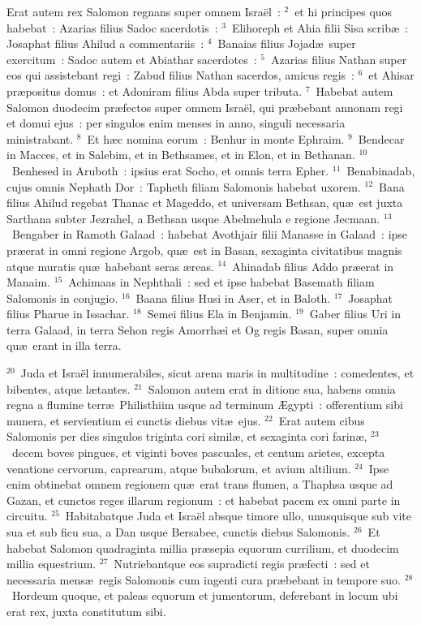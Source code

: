\bchapter
\lettrine[lines=3,image=true,loversize=0.05,lraise=-0.03]{E}{}rat autem rex Salomon regnans super omnem Isra\"el~:
${}^{2}$~et hi principes quos habebat~: Azarias filius Sadoc sacerdotis~:
${}^{3}$~Elihoreph et Ahia filii Sisa scrib\ae~: Josaphat filius Ahilud a commentariis~:
${}^{4}$~Banaias filius Jojad\ae\ super exercitum~: Sadoc autem et Abiathar sacerdotes~:
${}^{5}$~Azarias filius Nathan super eos qui assistebant regi~: Zabud filius Nathan sacerdos, amicus regis~:
${}^{6}$~et Ahisar pr\ae positus domus~: et Adoniram filius Abda super tributa.
${}^{7}$~Habebat autem Salomon duodecim pr\ae fectos super omnem Isra\"el, qui pr\ae bebant annonam regi et domui ejus~: per singulos enim menses in anno, singuli necessaria ministrabant.
${}^{8}$~Et h\ae c nomina eorum~: Benhur in monte Ephraim.
${}^{9}$~Bendecar in Macces, et in Salebim, et in Bethsames, et in Elon, et in Bethanan.
${}^{10}$~Benhesed in Aruboth~: ipsius erat Socho, et omnis terra Epher.
${}^{11}$~Benabinadab, cujus omnis Nephath Dor~: Tapheth filiam Salomonis habebat uxorem.
${}^{12}$~Bana filius Ahilud regebat Thanac et Mageddo, et universam Bethsan, qu\ae\ est juxta Sarthana subter Jezrahel, a Bethsan usque Abelmehula e regione Jecmaan.
${}^{13}$~Bengaber in Ramoth Galaad~: habebat Avothjair filii Manasse in Galaad~: ipse pr\ae erat in omni regione Argob, qu\ae\ est in Basan, sexaginta civitatibus magnis atque muratis qu\ae\ habebant seras \ae reas.
${}^{14}$~Ahinadab filius Addo pr\ae erat in Manaim.
${}^{15}$~Achimaas in Nephthali~: sed et ipse habebat Basemath filiam Salomonis in conjugio.
${}^{16}$~Baana filius Husi in Aser, et in Baloth.
${}^{17}$~Josaphat filius Pharue in Issachar.
${}^{18}$~Semei filius Ela in Benjamin.
${}^{19}$~Gaber filius Uri in terra Galaad, in terra Sehon regis Amorrh\ae i et Og regis Basan, super omnia qu\ae\ erant in illa terra.


${}^{20}$~Juda et Isra\"el innumerabiles, sicut arena maris in multitudine~: comedentes, et bibentes, atque l\ae tantes.
${}^{21}$~Salomon autem erat in ditione sua, habens omnia regna a flumine terr\ae\ Philisthiim usque ad terminum \AE gypti~: offerentium sibi munera, et servientium ei cunctis diebus vit\ae\ ejus.
${}^{22}$~Erat autem cibus Salomonis per dies singulos triginta cori simil\ae , et sexaginta cori farin\ae ,
${}^{23}$~decem boves pingues, et viginti boves pascuales, et centum arietes, excepta venatione cervorum, caprearum, atque bubalorum, et avium altilium.
${}^{24}$~Ipse enim obtinebat omnem regionem qu\ae\ erat trans flumen, a Thaphsa usque ad Gazan, et cunctos reges illarum regionum~: et habebat pacem ex omni parte in circuitu.
${}^{25}$~Habitabatque Juda et Isra\"el absque timore ullo, unusquisque sub vite sua et sub ficu sua, a Dan usque Bersabee, cunctis diebus Salomonis.
${}^{26}$~Et habebat Salomon quadraginta millia pr\ae sepia equorum currilium, et duodecim millia equestrium.
${}^{27}$~Nutriebantque eos supradicti regis pr\ae fecti~: sed et necessaria mens\ae\ regis Salomonis cum ingenti cura pr\ae bebant in tempore suo.
${}^{28}$~Hordeum quoque, et paleas equorum et jumentorum, deferebant in locum ubi erat rex, juxta constitutum sibi.


